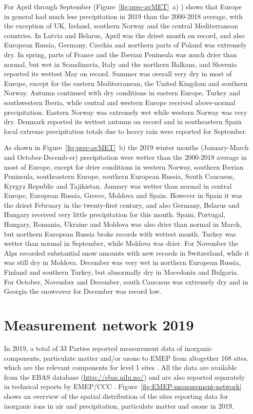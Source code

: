 For April through September (Figure~\ref{fig:prec-avMET}~a) ) shows that Europe in general had much less precipitation in 2019 than the 2000-2018 average, with the exception of UK, Ireland, southern Norway and the central Mediterranean countries. In Latvia and Belarus, April was the driest month on record, and also European Russia, Germany, Czechia and northern parts of Poland was extremely dry. In spring, parts of France and the Iberian Peninsula was much drier than normal, but wet in Scandinavia, Italy and the northern Balkans, and Slovenia reported its wettest May on record. Summer was overall very dry in most of Europe, except for the eastern Mediterranean, the United Kingdom and southern Norway. Autumn continued with dry conditions in eastern Europe, Turkey and southwestern Iberia, while central and western Europe received above-normal precipitation. Eastern Norway was extremely wet while western Norway was very dry. Denmark reported its wettest autumn on record and in southeastern Spain local extreme precipitation totals due to heavy rain were reported for September.

As shown in Figure~\ref{fig:prec-avMET}~b) the 2019 winter months (January-March and October-Decemb-er) precipitation were wetter than the 2000-2018 average in most of Europe, except for drier conditions in western Norway, southern Iberian Peninsula, southeastern Europe, southern European Russia, South Caucasus, Kyrgyz Republic
and Tajikistan. January was wetter than normal in central Europe, European Russia, Greece, Moldova and Spain. However in Spain it was the driest February in the twenty-first century, and also Germany, Belarus and Hungary received very little precipitation for this month. Spain, Portugal, Hungary, Romania, Ukraine and Moldova was also drier than normal in March, but northern European Russia broke records with wettest month. Turkey was wetter than normal in September, while Moldova was drier. For November the Alps recorded substantial snow amounts with new records in Switzerland, while it was still dry in Moldova. December was very wet in northern European Russia, Finland and southern Turkey, but abnormally dry in Macedonia and Bulgaria. For October, November and December, south Caucasus was extremely dry and in Georgia the snowcover for December was record low.
\section{Measurement network 2019} 
\label{Obs_2019}

In 2019, a total of 33 Parties reported measurement data of inorganic components, particulate matter and/or ozone to EMEP from altogether 168 sites, which are the relevant components for level 1 sites \citep{MonStrat2019}. 
All the data are available from the EBAS database (\url{http://ebas.nilu.no/}) and are also reported separately in technical reports by EMEP/CCC \citep{Hjellbrekke2021a,Hjellbrekke2021b}. Figure~\ref{fig:EMEP-measurement-network} shows an overview of the spatial distribution of the sites reporting data for inorganic ions in air and precipitation, particulate matter and ozone in 2019.

